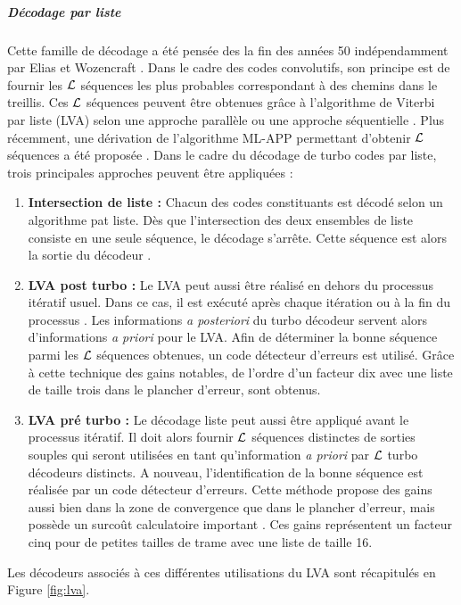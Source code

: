 \subparagraph{Décodage par liste} Cette famille de décodage a été pensée des la fin des années 50 indépendamment par Elias et Wozencraft \cite{elias1957list,wozencraft1958list}. Dans le cadre des codes convolutifs, son principe est de fournir les $\cal{L}$ séquences les plus probables correspondant à des chemins dans le treillis. Ces $\cal{L}$ séquences peuvent être obtenues grâce à l'algorithme de Viterbi par liste (LVA) selon une approche parallèle ou une approche séquentielle \cite{lva}. Plus récemment, une dérivation de l'algorithme ML-APP permettant d'obtenir $\cal{L}$ séquences a été proposée \cite{mlla}.
Dans le cadre du décodage de turbo codes par liste, trois principales approches peuvent être appliquées :
\begin{enumerate}
	\item \textbf{Intersection de liste : } Chacun des codes constituants est décodé selon un algorithme pat liste. Dès que l'intersection des deux ensembles de liste consiste en une seule séquence, le décodage s'arrête. Cette séquence est alors la sortie du décodeur \cite{sadowPair}. 
	\item \textbf{LVA post turbo : }  Le LVA peut aussi être réalisé en dehors du processus itératif usuel. Dans ce cas, il est exécuté après chaque itération ou à la fin du processus \cite{narayaList}. Les informations \textit{a posteriori} du turbo décodeur servent alors d'informations \textit{a priori} pour le LVA. Afin de déterminer la bonne séquence parmi les $\cal{L}$ séquences obtenues, un code détecteur d'erreurs est utilisé. Grâce à cette technique des gains notables, de l'ordre d'un facteur dix avec une liste de taille trois dans le plancher d'erreur, sont obtenus.
	\item \textbf{LVA pré turbo : } Le décodage liste peut aussi être appliqué avant le processus itératif. Il doit alors fournir $\cal{L}$ séquences distinctes de sorties souples qui seront utilisées en tant qu'information \textit{a priori} par $\cal{L}$ turbo décodeurs distincts. A nouveau, l'identification de la bonne séquence est réalisée par un code détecteur d'erreurs. Cette méthode propose des gains aussi bien dans la zone de convergence que dans le plancher d'erreur, mais possède un surcoût calculatoire important \cite{newList}. Ces gains représentent un facteur cinq pour de petites tailles de trame avec une liste de taille 16.
\end{enumerate}

Les décodeurs associés à ces différentes utilisations du LVA sont récapitulés en Figure \ref{fig:lva}. 


